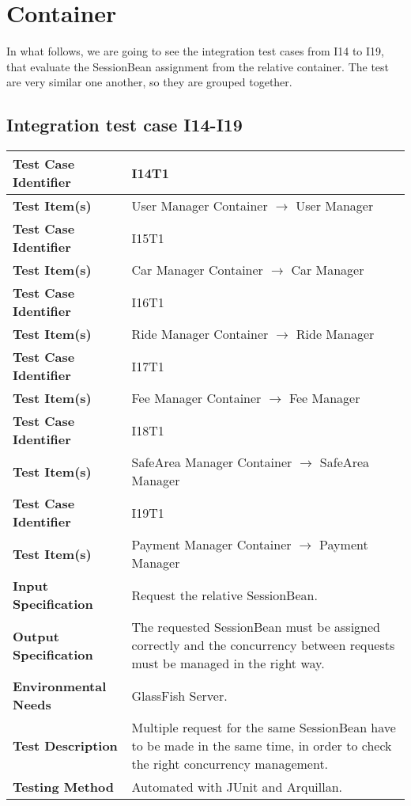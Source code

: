 \section{Container}

In what follows, we are going to see the integration test cases from I14 to I19, that evaluate the SessionBean assignment from the relative container. The test are very similar one another, so they are grouped together.

\subsection{Integration test case I14-I19}

\begin{tabular}{l p{}}
    \hline
    \textbf{Test Case Identifier} & I14T1\\
    \hline
    \textbf{Test Item(s)} & User Manager Container $\rightarrow$ User Manager \\
    \hline
    \hline
    \textbf{Test Case Identifier} & I15T1\\
    \hline
    \textbf{Test Item(s)} & Car Manager Container $\rightarrow$ Car Manager \\
    \hline
    \hline
    \textbf{Test Case Identifier} & I16T1\\
    \hline
    \textbf{Test Item(s)} & Ride Manager Container $\rightarrow$ Ride Manager \\
    \hline
    \hline
    \textbf{Test Case Identifier} & I17T1\\
    \hline
    \textbf{Test Item(s)} & Fee Manager Container $\rightarrow$ Fee Manager \\
    \hline
    \hline
    \textbf{Test Case Identifier} & I18T1\\
    \hline
    \textbf{Test Item(s)} & SafeArea Manager Container $\rightarrow$ SafeArea Manager \\
    \hline
    \hline
    \textbf{Test Case Identifier} & I19T1\\
    \hline
    \textbf{Test Item(s)} & Payment Manager Container $\rightarrow$ Payment Manager \\
    \hline
    \hline
    \textbf{Input Specification} & Request the relative SessionBean. \\
    \hline
    \textbf{Output Specification} & The requested SessionBean must be assigned correctly and the concurrency between requests must be managed in the right way. \\
    \hline
    \textbf{Environmental Needs} & GlassFish Server.\\
    \hline
    \textbf{Test Description} & Multiple request for the same SessionBean have to be made in the same time, in order to check the right concurrency management.\\
    \hline
    \textbf{Testing Method} & Automated with JUnit and Arquillan. \\
    \hline
\end{tabular}

